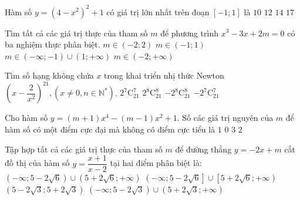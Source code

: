 \begin{ex}%
	Hàm số $y=(4-x^2)^2+1$ có giá trị lớn nhất trên đoạn $\left[- 1; 1\right]$ là
	\choice
	{$10$}
	{$12$}
	{$14$}
	{\True $17$}
\end{ex}
\begin{ex}%
	Tìm tất cả các giá trị thực của tham số $m$ để phương trình $x^3-3x+2m=0$ có ba nghiệm thực phân biệt. 
	\choice
	{$m\in \left (- 2; 2\right)$}
	{\True $m\in \left (- 1; 1\right)$}
	{$m\in \left (- \infty;-1\right) \cup (1;+\infty)$}
	{$m\in \left (- 2;+\infty\right)$}
\end{ex}
\begin{ex}%
	Tìm số hạng không chứa $x$ trong khai triển nhị thức Newton ${\left (x-\dfrac{2}{x^2} \right)} ^{21}, (x\ne 0, n\in \mathbb{N}^*)$. 
	\choice
	{$2^7\mathrm{C}_{21}^7$}
	{$2^8\mathrm{C}_{21} ^8$}
	{$-2^8\mathrm{C}_{21} ^8$}
	{\True $-2^7\mathrm{C}_{21}^7$}
\end{ex}
\begin{ex}%
	Cho hàm số $y=(m+1) x^4-(m-1) x^2+1$. Số các giá trị nguyên của $m$ để hàm số có một điểm cực đại mà không có điểm cực tiểu là
	\choice
	{$1$}
	{\True $0$}
	{$3$}
	{$2$}
\end{ex}
\begin{ex}%
	Tập hợp tất cả các giá trị thực của tham số $m$ để đường thẳng $y =-2x+m$ cắt đồ thị của hàm số $y=\dfrac{x+1}{x-2}$ tại hai điểm phân biệt là:
	\choice
	{\True $\left (- \infty; 5-2\sqrt{6} \right) \cup \left (5+2\sqrt{6};+\infty\right)$}
	{$\left (- \infty; 5-2\sqrt{6} \right] \cup \left[5+2\sqrt{6};+\infty\right)$}
	{$\left (5-2\sqrt{3}; 5+2\sqrt{3} \right)$}
	{$\left (- \infty; 5-2\sqrt{3} \right) \cup \left (5+2\sqrt{3};+\infty\right)$}
\end{ex}
